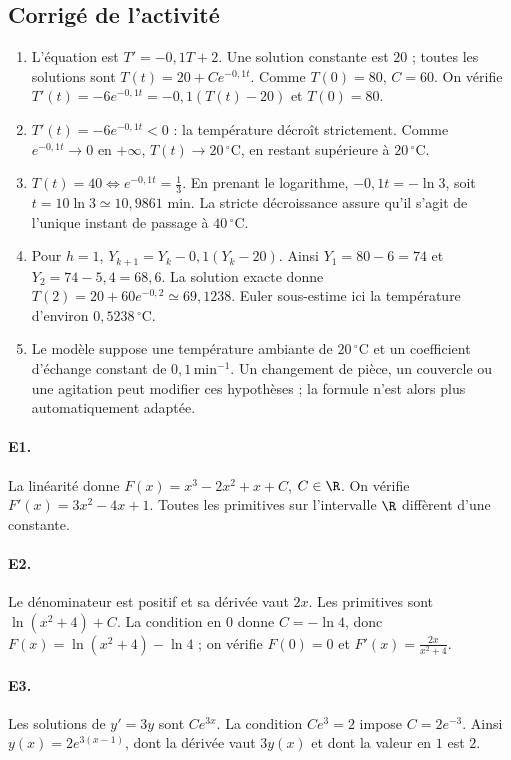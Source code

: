 \subsection{Corrigé de l'activité}\begin{enumerate}
\item L'équation est $T'=-0{,}1T+2$. Une solution constante est $20$ ; toutes les solutions sont $T(t)=20+Ce^{-0{,}1t}$. Comme $T(0)=80$, $C=60$. On vérifie $T'(t)=-6e^{-0{,}1t}=-0{,}1(T(t)-20)$ et $T(0)=80$.
\item $T'(t)=-6e^{-0{,}1t}<0$ : la température décroît strictement. Comme $e^{-0{,}1t}\to0$ en $+\infty$, $T(t)\to20\,^{\circ}\mathrm C$, en restant supérieure à $20\,^{\circ}\mathrm C$.
\item $T(t)=40\Longleftrightarrow e^{-0{,}1t}=\frac{1}{3}$. En prenant le logarithme, $-0{,}1t=-\ln3$, soit $t=10\ln3\simeq10{,}9861$ min. La stricte décroissance assure qu'il s'agit de l'unique instant de passage à $40\,^{\circ}\mathrm C$.
\item Pour $h=1$, $Y_{k+1}=Y_k-0{,}1(Y_k-20)$. Ainsi $Y_1=80-6=74$ et $Y_2=74-5{,}4=68{,}6$. La solution exacte donne $T(2)=20+60e^{-0{,}2}\simeq69{,}1238$. Euler sous-estime ici la température d'environ $0{,}5238\,^{\circ}\mathrm C$.
\item Le modèle suppose une température ambiante de $20\,^{\circ}\mathrm C$ et un coefficient d'échange constant de $0{,}1\,\mathrm{min}^{-1}$. Un changement de pièce, un couvercle ou une agitation peut modifier ces hypothèses ; la formule n'est alors plus automatiquement adaptée.
\end{enumerate}

\paragraph{E1.}La linéarité donne $F(x)=x^3-2x^2+x+C$, $C\in\R$. On vérifie $F'(x)=3x^2-4x+1$. Toutes les primitives sur l'intervalle $\R$ diffèrent d'une constante.

\paragraph{E2.}Le dénominateur est positif et sa dérivée vaut $2x$. Les primitives sont $\ln(x^2+4)+C$. La condition en $0$ donne $C=-\ln4$, donc $F(x)=\ln(x^2+4)-\ln4$ ; on vérifie $F(0)=0$ et $F'(x)=\frac{2x}{x^2+4}$.

\paragraph{E3.}Les solutions de $y'=3y$ sont $Ce^{3x}$. La condition $Ce^3=2$ impose $C=2e^{-3}$. Ainsi $y(x)=2e^{3(x-1)}$, dont la dérivée vaut $3y(x)$ et dont la valeur en $1$ est $2$.

